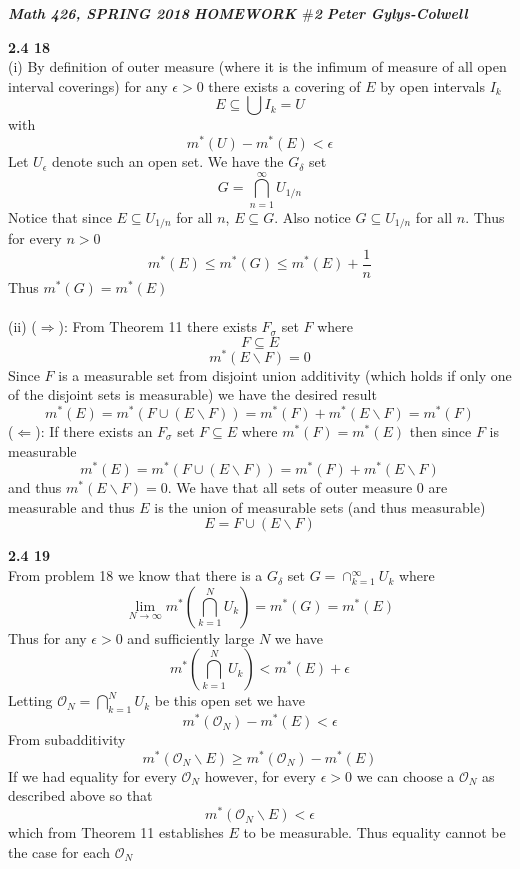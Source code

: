 \documentclass[12pt]{article}
\newenvironment{ques}[1]{\textbf{#1}\vspace{1 mm}\\ }{\bigskip}
\theoremstyle{definition}
\renewcommand{\l}{\left }
\renewcommand{\r}{\right }
\renewcommand{\-}{\backslash}
\begin{document}
\noindent \textit{\textbf{Math 426, SPRING 2018}} \hspace{1.3cm}
\textit{\textbf{HOMEWORK $\#$2}} \hspace{1.3cm} \textit{\textbf{Peter
Gylys-Colwell}} 

\vspace{1cm}
\begin{ques}{2.4 18}
	(i) By definition of outer measure (where it is the infimum of measure of
	all open interval coverings) for any $\epsilon >0$ there exists a covering
	of $E$ by open intervals $I_k$
	$$E \subseteq \bigcup I_k = U$$
	with
	$$m^*(U) -m^*(E) < \epsilon$$
	Let $U_\epsilon$ denote such an open set. We have the $G_\delta$ set
	$$G = \bigcap_{n=1}^\infty U_{1/n}$$
	Notice that since $E \subseteq U_{1/n}$ for all $n$, $E \subseteq G$. Also
	notice $G\subseteq U_{1/n}$ for all $n$. Thus for every $n> 0$
	$$m^{*}(E) \le m^{*}(G) \le m^{*}(E) + \frac 1 n$$
	Thus $m^*(G) = m^*(E)$\\
	\\
	(ii)
	($\Rightarrow$): From Theorem 11 there exists $F_\sigma$ set $F$ where
	$$F \subseteq E$$
	$$m^*(E\backslash F) = 0$$
	Since $F$ is a measurable set from disjoint union additivity (which holds if only
	one of the disjoint sets is measurable) we have the desired result
	$$m^*(E) = m^*(F \cup (E \backslash F)) = m^*(F) + m^*(E \backslash F) = m^*(F)$$
	($\Leftarrow$): If there exists an $F_\sigma$ set $F \subseteq E$ where
	$m^*(F) = m^*(E)$ then since $F$ is measurable
	$$m^*(E) = m^*(F \cup (E \backslash F)) = m^*(F) + m^*(E \backslash F)$$
	and thus $m^*(E \backslash F) = 0$. We have that all sets of outer measure
	$0$ are measurable and thus $E$ is the union of measurable sets (and thus
	measurable)
	$$E = F \cup (E \backslash F)$$
\end{ques}

\begin{ques}{2.4 19}
	From problem 18 we know that there is a $G_\delta$ set $G =
	\cap_{k=1}^\infty U_k$ where 
	$$\lim_{N \to \infty} m^*\l(\bigcap_{k=1}^N U_k\r) = m^{*}(G) = m^*(E)$$
	Thus for any $\epsilon > 0$ and sufficiently large $N$ we have
	$$m^*\l(\bigcap_{k=1}^N U_k\r) < m^{*}(E) + \epsilon$$
	Letting $\mathcal O_N = \bigcap_{k=1}^N U_k$ be this open set we have
	$$m^*\l(\mathcal O_N \r) - m^{*}(E) < \epsilon$$
	From subadditivity 
	$$m^*(\mathcal O_N \backslash E) \geq m^*(\mathcal O_N) - m^*(E)$$
	If we had equality for every $\mathcal O_N$ however, for every $\epsilon > 0$
	we can choose a $\mathcal O_N$ as described above so that
	$$m^*(\mathcal O_N \backslash E) < \epsilon$$
	which from Theorem 11 establishes $E$ to be measurable. Thus equality
	cannot be the case for each $\mathcal O_N$
\end{ques}
\end{document}
